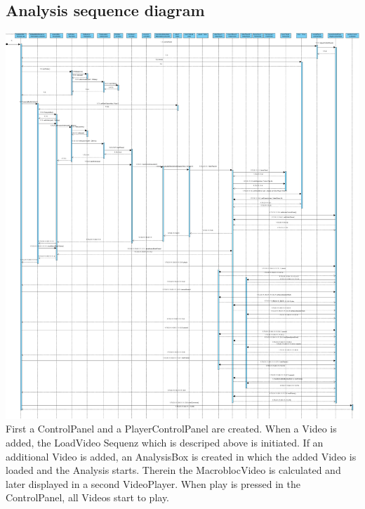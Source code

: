 \documentclass[twoside]{book}
\newcommand{\+}{\discretionary{\mbox{\scriptsize$\hookleftarrow$}}{}{}}
\begin{document}
\subsection*{Analysis sequence diagram}
{\centering\includegraphics[width=1\textwidth]{SequenceDiagram2.jpg}}\\
First a ControlPanel and a PlayerControlPanel are created. When a Video is added, the LoadVideo Sequenz which is descriped above is initiated.  If an additional Video is added, an AnalysisBox is created in which the added Video is loaded and the Analysis starts. Therein the MacroblocVideo is calculated and later displayed in a second VideoPlayer. When play is pressed in the ControlPanel, all Videos start to play.
\newpage
\end{document}
